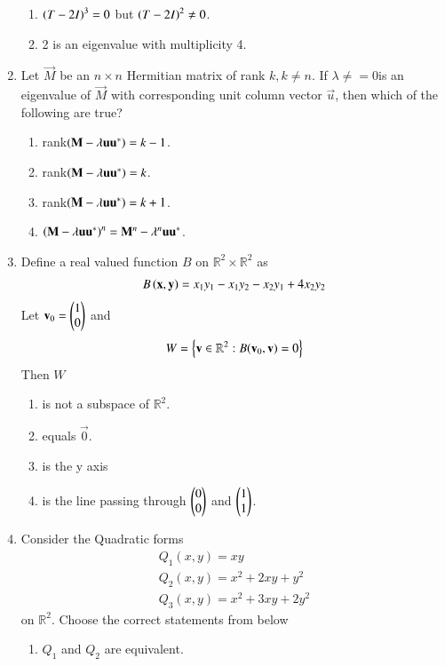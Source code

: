 \begin{enumerate}[label=\thesection.\arabic*.,ref=\thesection.\theenumi]
\begin{enumerate}
\item $\left(T-2I\right)^3 = 0$ but $\left(T-2I\right)^2 \ne 0$.
\item 2 is an eigenvalue with multiplicity 4.
\end{enumerate}
%
\item Let $\vec{M}$ be an $n \times n$ Hermitian matrix of rank $k, k \ne n$.  If $\lambda \ne = 0$is an eigenvalue of $\vec{M}$ with corresponding unit column vector $\vec{u}$, then which of the
following are true?
\begin{enumerate}
\item rank$\left(\mathbf{M}- \lambda \mathbf{u}\mathbf{u}^*\right) = k-1$.
\item rank$\left(\mathbf{M}- \lambda \mathbf{u}\mathbf{u}^*\right) = k$.
\item rank$\left(\mathbf{M}- \lambda \mathbf{u}\mathbf{u}^*\right) = k+1$.
\item $\left(\mathbf{M}- \lambda \mathbf{u}\mathbf{u}^*\right)^n = \mathbf{M}^n - \lambda^n \mathbf{u}\mathbf{u}^*$.
\end{enumerate}
%
\item Define a real valued function $B$ on $\mathbb{R}^2 \times \mathbb{R}^2 $ as 
\begin{align}
B\left(\mathbf{x},\mathbf{y}\right) = x_1y_1 - x_1y_2-x_2y_1+4x_2y_2
\end{align}
Let $\mathbf{v}_0 = \begin{pmatrix}1\\0\end{pmatrix}$ and 
\begin{align}
W = \left\{\mathbf{v} \in \mathbb{R}^2: B(\mathbf{v}_0,\mathbf{v}) =0\right\}
\end{align}
Then $W$
\begin{enumerate}
\item is not a subspace of $\mathbb{R}^2$.
\item equals $\vec{0}$.
\item is the y axis
\item is the line passing through $\begin{pmatrix}0 \\ 0\end{pmatrix}$ and $\begin{pmatrix}1 \\ 1\end{pmatrix}$.
\end{enumerate}
%
\item Consider the Quadratic forms
\begin{align}
Q_1(x,y) = xy
\\
Q_2(x,y) = x^2+2xy+y^2
\\
Q_3(x,y) = x^2+3xy+2y^2
\end{align}
%
on $\mathbb{R}^2$.  Choose the correct statements from below
\begin{enumerate}
\item $Q_1$ and $Q_2$ are equivalent.

\end{enumerate}
\end{enumerate}
